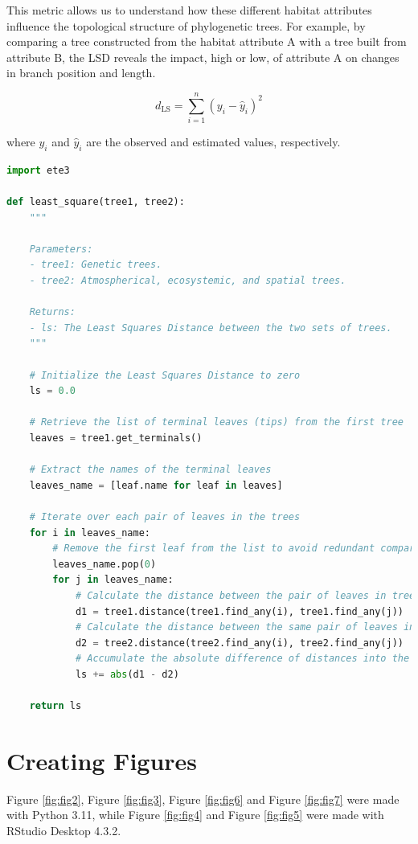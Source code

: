 This metric allows us to understand how these different habitat attributes influence the topological structure of phylogenetic trees. For example, by comparing a tree constructed from the habitat attribute A with a tree built from attribute B, the LSD reveals the impact, high or low, of attribute A on changes in branch position and length.

\begin{equation}\label{eq:ls}
    d_{\text{LS}} = \sum_{i=1}^{n} (y_i - \hat{y}_i)^2
\end{equation}

where $y_i$ and $\hat{y}_i$ are the observed and estimated values, respectively.

\begin{lstlisting}[label=lst:LeastSquare, language=Python, caption=Python script for calculating the LSD using the ete3 package in the aPhyloGeo package]
import ete3

def least_square(tree1, tree2):
    """
    
    Parameters:
    - tree1: Genetic trees.
    - tree2: Atmospherical, ecosystemic, and spatial trees.

    Returns:
    - ls: The Least Squares Distance between the two sets of trees.
    """
    
    # Initialize the Least Squares Distance to zero
    ls = 0.0
    
    # Retrieve the list of terminal leaves (tips) from the first tree
    leaves = tree1.get_terminals()
    
    # Extract the names of the terminal leaves
    leaves_name = [leaf.name for leaf in leaves]
    
    # Iterate over each pair of leaves in the trees
    for i in leaves_name:
        # Remove the first leaf from the list to avoid redundant comparisons
        leaves_name.pop(0)
        for j in leaves_name:
            # Calculate the distance between the pair of leaves in tree1
            d1 = tree1.distance(tree1.find_any(i), tree1.find_any(j))
            # Calculate the distance between the same pair of leaves in tree2
            d2 = tree2.distance(tree2.find_any(i), tree2.find_any(j))
            # Accumulate the absolute difference of distances into the LSD
            ls += abs(d1 - d2)
    
    return ls
\end{lstlisting}

\section{Creating Figures}\label{Figures}
Figure \ref{fig:fig2}, Figure \ref{fig:fig3}, Figure \ref{fig:fig6} and Figure \ref{fig:fig7} were made with Python 3.11, while Figure \ref{fig:fig4} and Figure \ref{fig:fig5} were made with RStudio Desktop 4.3.2.

